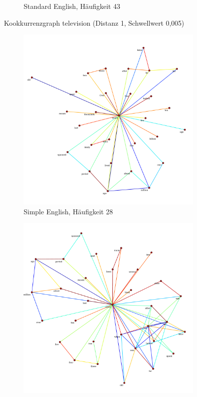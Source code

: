 \documentclass[11pt, a4paper]{article}
\begin{document}
\begin{figure}[hp!]
\begin{subfigure}[b]{0.5\textwidth}
        \caption{Standard English, Häufigkeit 43}
    \end{subfigure}
    \caption{Kookkurrenzgraph television (Distanz 1, Schwellwert 0,005)}
    \label{fig:hw-television}
\end{figure}

\begin{figure}[hp!]
    \centering
    \begin{subfigure}[b]{0.5\textwidth}
        \includegraphics[scale=.25]{../../data/results/cooc_wiki_sim/topwords-t0005/graph_years.pdf}
        \caption{Simple English, Häufigkeit 28}
    \end{subfigure}
    \begin{subfigure}[b]{0.5\textwidth}
        \includegraphics[scale=.25]{../../data/results/cooc_wiki_en/topwords-t0005/graph_years.pdf}

\end{subfigure}
\end{figure}
\end{document}
